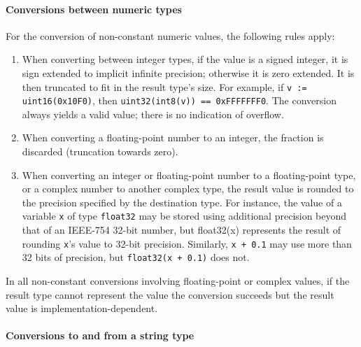 \paragraph{Conversions between numeric types}

For the conversion of non-constant numeric values, the following rules
apply:

\begin{enumerate}
\item
  When converting between integer types, if the value is a signed
  integer, it is sign extended to implicit infinite precision; otherwise
  it is zero extended. It is then truncated to fit in the result type's
  size. For example, if \texttt{v := uint16(0x10F0)}, then
  \texttt{uint32(int8(v)) == 0xFFFFFFF0}. The conversion always yields a
  valid value; there is no indication of overflow.
\item
  When converting a floating-point number to an integer, the fraction is
  discarded (truncation towards zero).
\item
  When converting an integer or floating-point number to a
  floating-point type, or a complex number to another complex type, the
  result value is rounded to the precision specified by the destination
  type. For instance, the value of a variable \texttt{x} of type
  \texttt{float32} may be stored using additional precision beyond that
  of an IEEE-754 32-bit number, but float32(x) represents the result of
  rounding \texttt{x}'s value to 32-bit precision. Similarly,
  \texttt{x + 0.1} may use more than 32 bits of precision, but
  \texttt{float32(x + 0.1)} does not.
\end{enumerate}

In all non-constant conversions involving floating-point or complex
values, if the result type cannot represent the value the conversion
succeeds but the result value is implementation-dependent.

\paragraph{Conversions to and from a string type}

